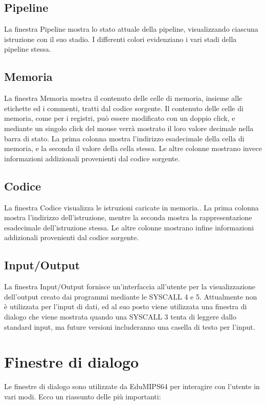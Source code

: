 \documentclass[letterpaper,10pt,english]{sphinxmanual}
\begin{document}
\subsection{Pipeline}
\label{user-interface:pipeline}
La finestra Pipeline mostra lo stato attuale della pipeline, visualizzando
ciascuna istruzione con il suo stadio.  I differenti colori evidenziano i vari
stadi della pipeline stessa.


\subsection{Memoria}
\label{user-interface:memoria}
La finestra Memoria mostra il contenuto delle celle di memoria, insieme alle
etichette ed i commenti, tratti dal codice sorgente. Il contenuto delle celle
di memoria, come per i registri, può essere modificato con un doppio
click, e mediante un singolo click del mouse verrà mostrato il loro valore
decimale nella barra di stato.  La prima colonna mostra l'indirizzo
esadecimale della cella di memoria, e la seconda il valore della cella stessa.
Le altre colonne mostrano invece informazioni addizionali provenienti dal
codice sorgente.


\subsection{Codice}
\label{user-interface:codice}
La finestra Codice visualizza le istruzioni caricate in memoria.. La prima
colonna mostra l'indirizzo dell'istruzione, mentre la seconda mostra la
rappresentazione esadecimale dell'istruzione stessa. Le altre colonne mostrano
infine informazioni addizionali provenienti dal codice sorgente.


\subsection{Input/Output}
\label{user-interface:input-output}
La finestra Input/Output fornisce un'interfaccia all'utente per la
visualizzazione dell'output creato dai programmi mediante le SYSCALL 4 e 5.
Attualmente non è utilizzata per l'input di dati, ed al suo posto viene
utilizzata una finestra di dialogo che viene mostrata quando una SYSCALL 3
tenta di leggere dallo standard input, ma future versioni includeranno una
casella di testo per l'input.


\section{Finestre di dialogo}
\label{user-interface:finestre-di-dialogo}
Le finestre di dialogo sono utilizzate da EduMIPS64 per interagire con l'utente
in vari modi. Ecco un riassunto delle più importanti:
\end{document}
